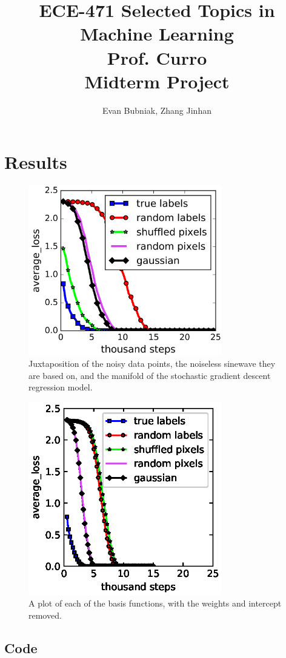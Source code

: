 \documentclass[12pt]{article}
\title{%
	ECE-471 Selected Topics in Machine Learning \\
	Prof. Curro \\
	Midterm Project}
\author{Evan Bubniak, Zhang Jinhan}
\begin{document}
\maketitle

\section{Results}

\begin{figure}[H]
	\centering
	\includegraphics[width=0.75\textwidth]{paper_source/fig.png}
	\caption{Juxtaposition of the noisy data points, the noiseless sinewave they are based on, and the manifold of the stochastic gradient descent regression model.}
\end{figure}

\begin{figure}[H]
	\centering
	\includegraphics[width=0.75\textwidth]{results_1/output.eps}
	\caption{A plot of each of the basis functions, with the weights and intercept removed.}
\end{figure}

\clearpage
\begin{adjustwidth}{-50pt}{0pt}

\section{Code}

\end{adjustwidth}
\end{document}
